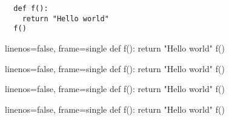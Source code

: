 \documentclass{article}
\begin{document}
\begin{verbatim}
  def f():
    return "Hello world"
  f()
\end{verbatim}

\begin{pycode}{linenos=false, frame=single}
  def f():
    return "Hello world"
  f()
\end{pycode}

\begin{pyblock*}{linenos=false, frame=single}
  def f():
    return "Hello world"
  f()
\end{pyblock*}

\begin{sageverbatim*}{linenos=false, frame=single}
  def f():
    return "Hello world"
  f()
\end{sageverbatim*}

\begin{sympyconsole*}{linenos=false, frame=single}
  def f():
    return "Hello world"
  f()
\end{sympyconsole*}
\end{document}

